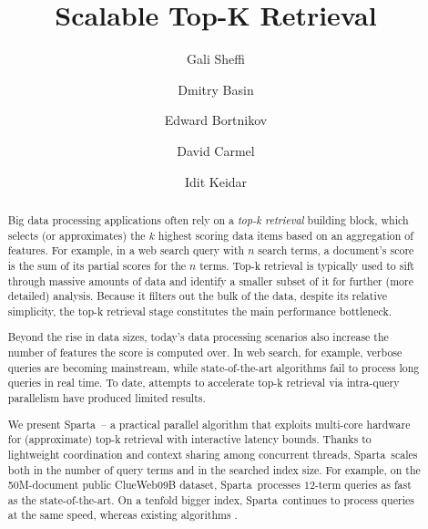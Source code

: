 \documentclass[sigplan,10pt,review,anonymous]{acmart}
\title{Scalable Top-K Retrieval}
\author{Gali Sheffi}%
\author{Dmitry Basin}%
\author{Edward Bortnikov}%
\author{David Carmel}%
\author{Idit Keidar}%
\newcommand{\alg}{Sparta}
\newcommand{\inred}[1]{{\color{red}{#1}}}
\begin{document}
\begin{abstract}



Big data processing applications often rely on a \emph{top-k retrieval} building block, which selects (or approximates) the $k$ highest scoring data items based on an 
aggregation of features. For example, in a web search query with $n$ search terms, a document's score is the sum 
of its partial scores for the $n$ terms. Top-k  retrieval is typically used to sift through massive amounts of data and identify a smaller subset of it for 
further (more detailed) analysis. Because it filters out the bulk of the data, despite its relative simplicity, the top-k retrieval stage constitutes the main performance bottleneck.  

Beyond the rise in data  sizes, today's 
data processing scenarios also increase the number of features the score is computed over. 
In web search, for example, %
verbose queries are becoming mainstream,  
while state-of-the-art algorithms fail to process  long queries in real time. To date, attempts to
accelerate top-k retrieval via 
intra-query parallelism have produced limited results. 

We present \alg\ -- a practical parallel algorithm that exploits multi-core hardware for (approximate) top-k retrieval 
with interactive latency bounds. %
Thanks to lightweight coordination and context sharing among concurrent threads,
\alg\ scales both in the number of query terms and in the searched index size. 
For example, on the 50M-document public ClueWeb09B 
dataset, \alg\  processes $12$-term queries \inred{twice} as fast as  the state-of-the-art. 
On a tenfold  bigger index, 
\alg\ continues to process queries at the same speed, whereas existing algorithms 
\inred{deteriorate significantly}.
\end{abstract}


\maketitle








\clearpage

  
\end{document}
